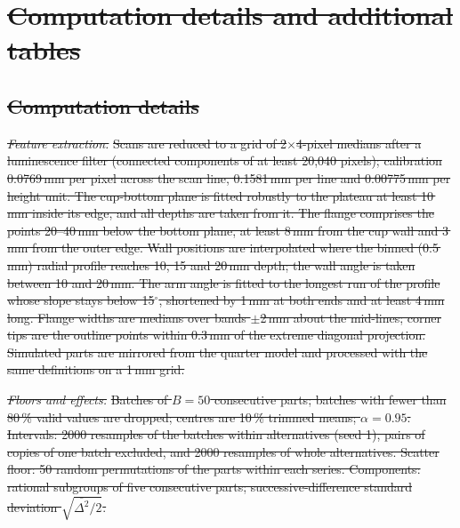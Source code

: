 \documentclass[pdflatex,sn-basic,lineno]{sn-jnl} %
\providecommand{\DIFdel}[1]{{\protect\color{red}\sout{#1}}}                      %
\begin{document}

\section{\DIFdel{Computation details and additional tables}}%
\addtocounter{section}{-1}%

\subsection{\DIFdel{Computation details}}%
\addtocounter{subsection}{-1}%

\emph{\DIFdel{Feature extraction.}} %
\DIFdel{Scans are reduced to a grid of 2$\times$4-pixel medians after a luminescence filter (connected components of at least 20,040 pixels); calibration 0.0769\,mm per pixel across the scan line, 0.1581\,mm per line and 0.00775\,mm per height unit. The cup-bottom plane is fitted robustly to the plateau at least 10\,mm inside its edge, and all depths are taken from it. The flange comprises the points 20--40\,mm below the bottom plane, at least 8\,mm from the cup wall and 3\,mm from the outer edge. Wall positions are interpolated where the binned (0.5\,mm) radial profile reaches 10, 15 and 20\,mm depth; the wall angle is taken between 10 and 20\,mm. The arm angle is fitted to the longest run of the profile whose slope stays below 15$^\circ$, shortened by 1\,mm at both ends and at least 4\,mm long. Flange widths are medians over bands $\pm$2\,mm about the mid-lines; corner tips are the outline points within 0.3\,mm of the extreme diagonal projection. Simulated parts are mirrored from the quarter model and processed with the same definitions on a 1\,mm grid.
}%

\emph{\DIFdel{Floors and effects.}} %
\DIFdel{Batches of $B=50$ consecutive parts; batches with fewer than 80\,\% valid values are dropped; centres are 10\,\% trimmed means; $\alpha=0.95$. Intervals: 2000 resamples of the batches within alternatives (seed 1), pairs of copies of one batch excluded, and 2000 resamples of whole alternatives. Scatter floor: 50 random permutations of the parts within each series. Components: rational subgroups of five consecutive parts; successive-difference standard deviation $\sqrt{\overline{\Delta^2}/2}$.
}%
\end{document}
